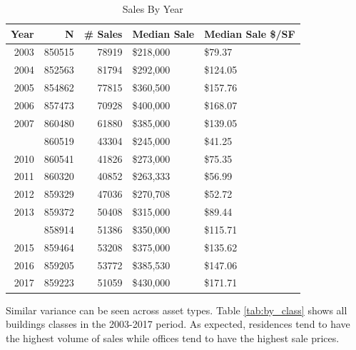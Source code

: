 \documentclass[12pt,]{article}
\begin{document}
\begin{table}

\caption{\label{tab:by_year}\label{tab:by_year} Sales By Year}
\centering
\begin{tabular}[t]{rrrll}
\toprule
Year & N & \# Sales & Median Sale & Median Sale \$/SF\\
\midrule
2003 & 850515 & 78919 & \$218,000 & \$79.37\\
2004 & 852563 & 81794 & \$292,000 & \$124.05\\
2005 & 854862 & 77815 & \$360,500 & \$157.76\\
2006 & 857473 & 70928 & \$400,000 & \$168.07\\
2007 & 860480 & 61880 & \$385,000 & \$139.05\\
\addlinespace
2009 & 860519 & 43304 & \$245,000 & \$41.25\\
2010 & 860541 & 41826 & \$273,000 & \$75.35\\
2011 & 860320 & 40852 & \$263,333 & \$56.99\\
2012 & 859329 & 47036 & \$270,708 & \$52.72\\
2013 & 859372 & 50408 & \$315,000 & \$89.44\\
\addlinespace
2014 & 858914 & 51386 & \$350,000 & \$115.71\\
2015 & 859464 & 53208 & \$375,000 & \$135.62\\
2016 & 859205 & 53772 & \$385,530 & \$147.06\\
2017 & 859223 & 51059 & \$430,000 & \$171.71\\
\bottomrule
\end{tabular}
\end{table}

Similar variance can be seen across asset types. Table
\ref{tab:by_class} shows all buildings classes in the 2003-2017 period.
As expected, residences tend to have the highest volume of sales while
offices tend to have the highest sale prices.
\end{document}

